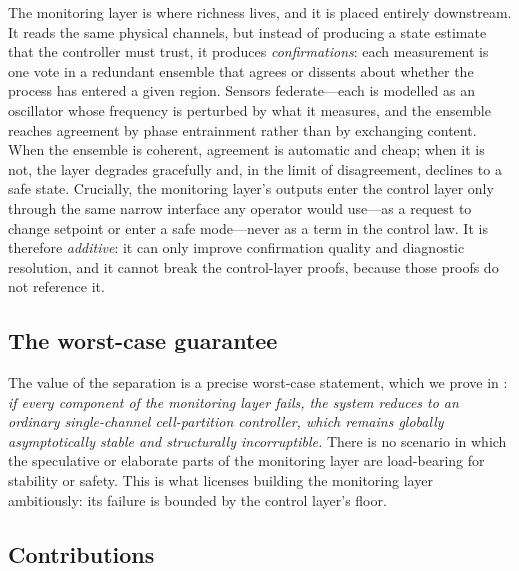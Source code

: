 \documentclass[11pt,a4paper,twocolumn]{article}
\theoremstyle{thmstyle}
\theoremstyle{definition}
\theoremstyle{remark}
\begin{document}
The monitoring layer is where richness lives, and it is placed entirely
downstream. It reads the same physical channels, but instead of
producing a state estimate that the controller must trust, it produces
\emph{confirmations}: each measurement is one vote in a redundant
ensemble that agrees or dissents about whether the process has entered a
given region. Sensors federate---each is modelled as an oscillator whose
frequency is perturbed by what it measures, and the ensemble reaches
agreement by phase entrainment rather than by exchanging content. When
the ensemble is coherent, agreement is automatic and cheap; when it is
not, the layer degrades gracefully and, in the limit of disagreement,
declines to a safe state. Crucially, the monitoring layer's outputs enter
the control layer only through the same narrow interface any operator
would use---as a request to change setpoint or enter a safe mode---never
as a term in the control law. It is therefore \emph{additive}: it can
only improve confirmation quality and diagnostic resolution, and it
cannot break the control-layer proofs, because those proofs do not
reference it.

\subsection{The worst-case guarantee}

The value of the separation is a precise worst-case statement, which we
prove in : \emph{if every component of the
monitoring layer fails, the system reduces to an ordinary
single-channel cell-partition controller, which remains globally
asymptotically stable and structurally incorruptible.} There is no
scenario in which the speculative or elaborate parts of the monitoring
layer are load-bearing for stability or safety. This is what licenses
building the monitoring layer ambitiously: its failure is bounded by the
control layer's floor.

\subsection{Contributions}
\end{document}
